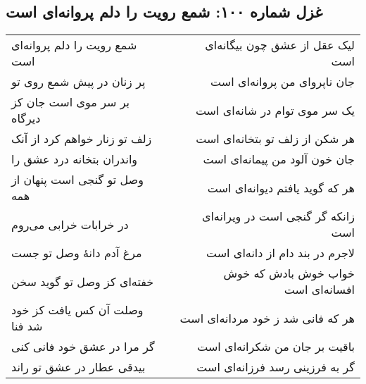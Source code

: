 \begin{center}
\section*{غزل شماره ۱۰۰: شمع رویت را دلم پروانه‌ای است}
\label{sec:100}
\begin{longtable}{l p{0.5cm} r}
شمع رویت را دلم پروانه‌ای است
&&
لیک عقل از عشق چون بیگانه‌ای است
\\
پر زنان در پیش شمع روی تو
&&
جان ناپروای من پروانه‌ای است
\\
بر سر موی است جان کز دیرگاه
&&
یک سر موی توام در شانه‌ای است
\\
زلف تو زنار خواهم کرد از آنک
&&
هر شکن از زلف تو بتخانه‌ای است
\\
واندران بتخانه درد عشق را
&&
جان خون آلود من پیمانه‌ای است
\\
وصل تو گنجی است پنهان از همه
&&
هر که گوید یافتم دیوانه‌ای است
\\
در خرابات خرابی می‌روم
&&
زانکه گر گنجی است در ویرانه‌ای است
\\
مرغ آدم دانهٔ وصل تو جست
&&
لاجرم در بند دام از دانه‌ای است
\\
خفته‌ای کز وصل تو گوید سخن
&&
خواب خوش بادش که خوش افسانه‌ای است
\\
وصلت آن کس یافت کز خود شد فنا
&&
هر که فانی شد ز خود مردانه‌ای است
\\
گر مرا در عشق خود فانی کنی
&&
باقیت بر جان من شکرانه‌ای است
\\
بیدقی عطار در عشق تو راند
&&
گر به فرزینی رسد فرزانه‌ای است
\\
\end{longtable}
\end{center}
